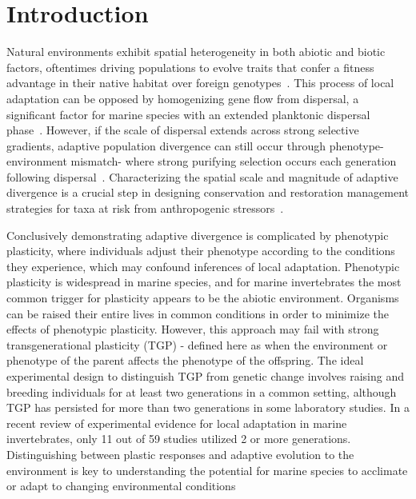 \documentclass[10pt,letterpaper]{article}
\begin{document}
\linenumbers
\section*{Introduction}

Natural environments exhibit spatial heterogeneity in both abiotic and biotic factors, oftentimes driving populations to evolve traits that confer a fitness advantage in their native habitat over foreign genotypes~\cite{Kawecki2004-qo}. This process of local adaptation can be opposed by homogenizing gene flow from dispersal, a significant factor for marine species with an extended planktonic dispersal phase~\cite{Grosberg2001-tv}. However, if the scale of dispersal extends across strong selective gradients, adaptive population divergence can still occur through phenotype-environment mismatch- where strong purifying selection occurs each generation following dispersal~\cite{Marshall2008-et,Schmidt2001-ex}. Characterizing the spatial scale and magnitude of adaptive divergence is a crucial step in designing conservation and restoration management strategies for taxa at risk from anthropogenic stressors~\cite{Baums2008-od,Carroll2014-ts}.\par
Conclusively demonstrating adaptive divergence is complicated by phenotypic plasticity, where individuals adjust their phenotype according to the conditions they experience\cite{West-Eberhard2003-ja}, which may confound inferences of local adaptation\cite{Kawecki2004-qo,Teplitsky2008-fe}. Phenotypic plasticity is widespread in marine species\cite{Conover2006-tk,Pepin1991-ja,Padilla2013-th}, and for marine invertebrates the most common trigger for plasticity appears to be the abiotic environment\cite{Padilla2013-th}. Organisms can be raised their entire lives in common conditions in order to minimize the effects of phenotypic plasticity. However, this approach may fail with strong transgenerational plasticity (TGP) - defined here as when the environment or phenotype of the parent affects the phenotype of the offspring\cite{Kawecki2004-qo,Guillaume2016-vu}. The ideal experimental design to distinguish TGP from genetic change involves raising and breeding individuals for at least two generations in a common setting\cite{Kawecki2004-qo}, although TGP has persisted for more than two generations in some laboratory studies\cite{Hercus2000-ai}. In a recent review of experimental evidence for local adaptation in marine invertebrates, only 11 out of 59 studies utilized 2 or more generations\cite{Sanford2011-fy}. Distinguishing between plastic responses and adaptive evolution to the environment is key to understanding the potential for marine species to acclimate or adapt to changing environmental conditions\cite{Salinas2013-ry}\par
\end{document}
